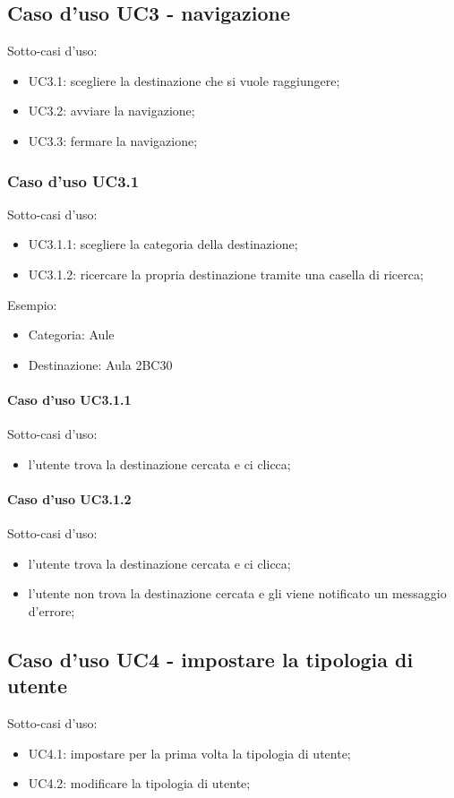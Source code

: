 \documentclass{article}
\begin{document}
	\subsection{Caso d'uso UC3 - navigazione}
	Sotto-casi d'uso:
	\begin{itemize}
		\item UC3.1: scegliere la destinazione che si vuole raggiungere;
		\item UC3.2: avviare la navigazione;
		\item UC3.3: fermare la navigazione;
	\end{itemize}
	
	\subsubsection{Caso d'uso UC3.1}
	Sotto-casi d'uso:
	\begin{itemize}
		\item UC3.1.1: scegliere la categoria della destinazione;
		\item UC3.1.2: ricercare la propria destinazione tramite una casella di ricerca;
	\end{itemize}
	Esempio:
	\begin{itemize}
		\item Categoria: Aule
		\item Destinazione: Aula 2BC30
	\end{itemize}
	
	\paragraph{Caso d'uso UC3.1.1}
	Sotto-casi d'uso:
	\begin{itemize}
		\item l'utente trova la destinazione cercata e ci clicca;
	\end{itemize}
	
	\paragraph{Caso d'uso UC3.1.2}
	Sotto-casi d'uso:
	\begin{itemize}
		\item l'utente trova la destinazione cercata e ci clicca;
		\item l'utente non trova la destinazione cercata e gli viene notificato un messaggio d'errore;
	\end{itemize}

	
	\subsection{Caso d'uso UC4 - impostare la tipologia di utente}
	Sotto-casi d'uso:
	\begin{itemize}
		\item UC4.1: impostare per la prima volta la tipologia di utente;
		\item UC4.2: modificare la tipologia di utente;
	\end{itemize}
\end{document}
